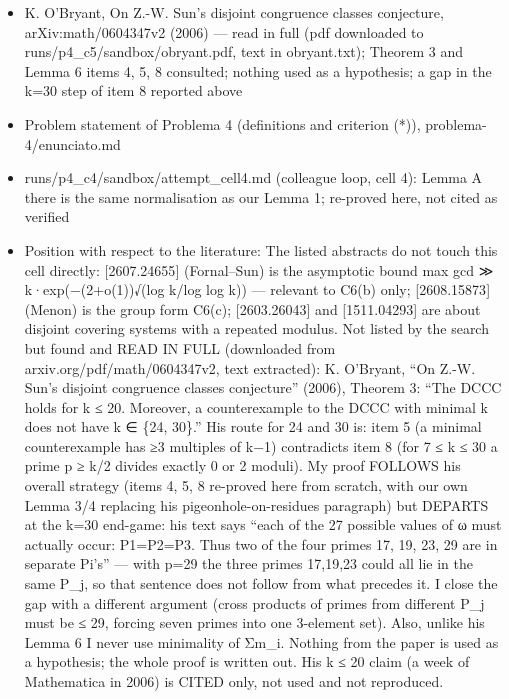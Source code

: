 \begin{itemize}
\tightlist
\item
  K. O'Bryant, On Z.-W. Sun's disjoint congruence classes conjecture,
  arXiv:math/0604347v2 (2006) --- read in full (pdf downloaded to
  runs/p4\_c5/sandbox/obryant.pdf, text in obryant.txt); Theorem 3 and
  Lemma 6 items 4, 5, 8 consulted; nothing used as a hypothesis; a gap
  in the k=30 step of item 8 reported above
\item
  Problem statement of Problema 4 (definitions and criterion (*)),
  problema-4/enunciato.md
\item
  runs/p4\_c4/sandbox/attempt\_cell4.md (colleague loop, cell 4): Lemma
  A there is the same normalisation as our Lemma 1; re-proved here, not
  cited as verified
\item
  Position with respect to the literature: The listed abstracts do not
  touch this cell directly: {[}2607.24655{]} (Fornal--Sun) is the
  asymptotic bound max gcd ≫ k·exp(−(2+o(1))√(log k/log log k)) ---
  relevant to C6(b) only; {[}2608.15873{]} (Menon) is the group form
  C6(c); {[}2603.26043{]} and {[}1511.04293{]} are about disjoint
  covering systems with a repeated modulus. Not listed by the search but
  found and READ IN FULL (downloaded from arxiv.org/pdf/math/0604347v2,
  text extracted): K. O'Bryant, ``On Z.-W. Sun's disjoint congruence
  classes conjecture'' (2006), Theorem 3: ``The DCCC holds for k ≤ 20.
  Moreover, a counterexample to the DCCC with minimal k does not have k
  ∈ \{24, 30\}.'' His route for 24 and 30 is: item 5 (a minimal
  counterexample has ≥3 multiples of k−1) contradicts item 8 (for 7 ≤ k
  ≤ 30 a prime p ≥ k/2 divides exactly 0 or 2 moduli). My proof FOLLOWS
  his overall strategy (items 4, 5, 8 re-proved here from scratch, with
  our own Lemma 3/4 replacing his pigeonhole-on-residues paragraph) but
  DEPARTS at the k=30 end-game: his text says ``each of the 27 possible
  values of ω must actually occur:
  \textbar P1\textbar=\textbar P2\textbar=\textbar P3. Thus
  two of the four primes 17, 19, 23, 29 are in separate Pi's'' --- with
  p=29 the three primes 17,19,23 could all lie in the same P\_j, so that
  sentence does not follow from what precedes it. I close the gap with a
  different argument (cross products of primes from different P\_j must
  be ≤ 29, forcing seven primes into one 3-element set). Also, unlike
  his Lemma 6 I never use minimality of Σm\_i. Nothing from the paper is
  used as a hypothesis; the whole proof is written out. His k ≤ 20 claim
  (a week of Mathematica in 2006) is CITED only, not used and not
  reproduced.
\end{itemize}


